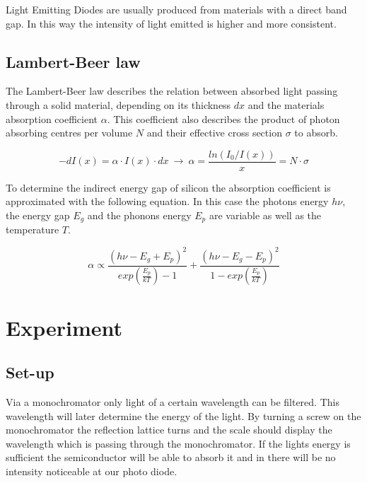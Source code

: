 \documentclass[]{article}
\begin{document}
Light Emitting Diodes are usually produced from materials with a direct band gap. In this way the intensity of light emitted is higher and more consistent.

\subsection{Lambert-Beer law}
The Lambert-Beer law describes the relation between absorbed light passing through a solid material, depending on its thickness $dx$ and the materials absorption coefficient $\alpha$. This coefficient also describes the   product of photon absorbing centres per volume $N$ and their effective cross section $\sigma$ to absorb. 

\begin{equation}
\label{eq:Lambert-Beer}
-dI(x) = \alpha \cdot I(x)\cdot dx\ \rightarrow\ \alpha=\frac{ln(I_0 / I(x))}{x} = N\cdot \sigma
\end{equation}

To determine the indirect energy gap of silicon the absorption coefficient is approximated with the following equation. In this case the photons energy $h\nu$, the energy gap $E_g$ and the phonons energy $E_p$ are variable as well as the temperature $T$.

\begin{equation}
\alpha \propto  \frac{(h\nu - E_g + E_p)^2}{exp\left(\frac{E_p}{kT}\right) -1} + \frac{(h\nu - E_g - E_p)^2}{1-exp\left(\frac{E_p}{kT}\right)} 
\end{equation}


\section{Experiment}
\subsection{Set-up}
Via a monochromator only light of a certain wavelength can be filtered. This wavelength will later determine the energy of the light. By turning a screw on the monochromator the reflection lattice turns and the scale should display the wavelength which is passing through the monochromator. If the lights energy is sufficient the semiconductor will be able to absorb it and in there will be no intensity noticeable at our photo diode. 
\end{document}

